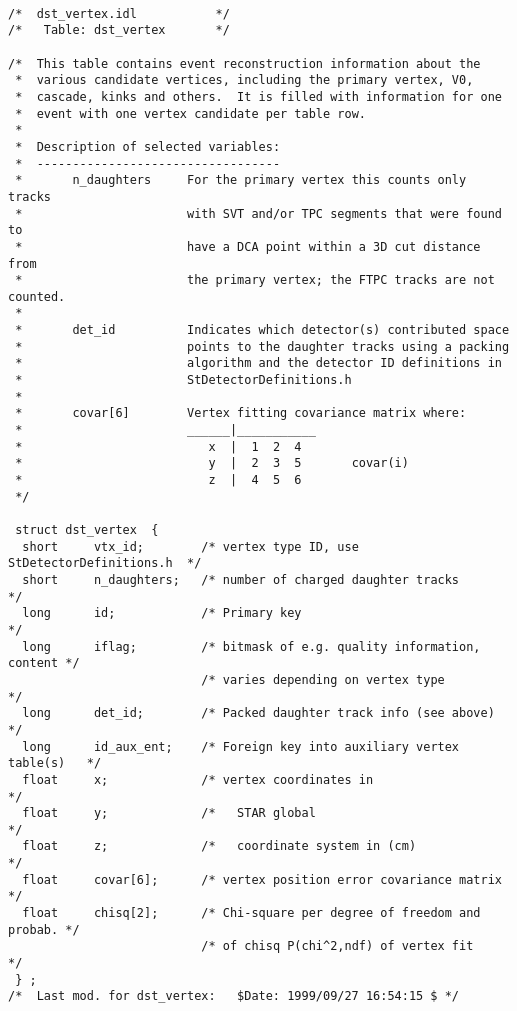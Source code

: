 \begin{verbatim}

/*  dst_vertex.idl           */
/*   Table: dst_vertex       */

/*  This table contains event reconstruction information about the
 *  various candidate vertices, including the primary vertex, V0,
 *  cascade, kinks and others.  It is filled with information for one
 *  event with one vertex candidate per table row. 
 *
 *  Description of selected variables:
 *  ----------------------------------
 *       n_daughters     For the primary vertex this counts only tracks
 *                       with SVT and/or TPC segments that were found to
 *                       have a DCA point within a 3D cut distance from
 *                       the primary vertex; the FTPC tracks are not counted. 
 *                         
 *       det_id          Indicates which detector(s) contributed space
 *                       points to the daughter tracks using a packing
 *                       algorithm and the detector ID definitions in
 *                       StDetectorDefinitions.h
 *
 *       covar[6]        Vertex fitting covariance matrix where:
 *                       ______|___________
 *                          x  |  1  2  4     
 *                          y  |  2  3  5       covar(i)
 *                          z  |  4  5  6    
 */

 struct dst_vertex  {
  short     vtx_id;        /* vertex type ID, use StDetectorDefinitions.h  */
  short     n_daughters;   /* number of charged daughter tracks            */
  long      id;            /* Primary key                                  */
  long      iflag;         /* bitmask of e.g. quality information, content */
                           /* varies depending on vertex type              */
  long      det_id;        /* Packed daughter track info (see above)       */
  long      id_aux_ent;    /* Foreign key into auxiliary vertex table(s)   */
  float     x;             /* vertex coordinates in                        */
  float     y;             /*   STAR global                                */
  float     z;             /*   coordinate system in (cm)                  */
  float     covar[6];      /* vertex position error covariance matrix      */
  float     chisq[2];      /* Chi-square per degree of freedom and probab. */
                           /* of chisq P(chi^2,ndf) of vertex fit          */
 } ;
/*  Last mod. for dst_vertex:   $Date: 1999/09/27 16:54:15 $ */

\end{verbatim}

